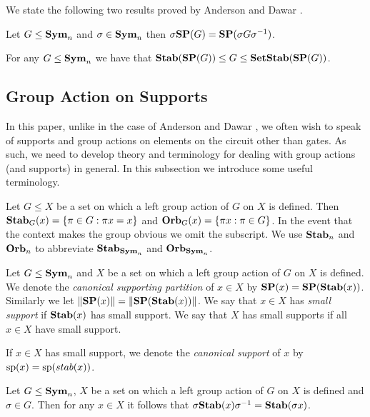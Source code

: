 \documentclass[../paper.tex]{subfiles}
\begin{document}
We state the following two results proved by Anderson and Dawar
\cite{AndersonD17}.

\begin{lem}
  \label{lem:SP_conjugation}
  Let $G \leq \text{\textbf{Sym}}_n$ and $\sigma \in \text{\textbf{Sym}}_n$ then $\sigma \text{\textbf{SP}} (G) = \text{\textbf{SP}}(\sigma
  G \sigma^{-1})$.
\end{lem}

\begin{lem}
  For any $G \leq \text{\textbf{Sym}}_n$ we have that $\text{\textbf{Stab}} (\text{\textbf{SP}} (G)) \leq G \leq
  \text{\textbf{SetStab}}(\text{\textbf{SP}}(G))$.
\end{lem}

\subsection{Group Action on Supports}
In this paper, unlike in the case of Anderson and Dawar \cite{AndersonD17}, we
often wish to speak of supports and group actions on elements on the circuit other than gates. As such, we need to develop theory and terminology for dealing with group actions (and
supports) in general. In this subsection we introduce some useful terminology.


\begin{definition}
  Let $G \leq X$ be a set on which a left group action of $G$ on $X$ is defined.
  Then $\text{\textbf{Stab}}_G (x) = \{\pi \in G : \pi x = x\}$ and $\text{\textbf{Orb}}_G (x) = \{\pi x : \pi
  \in G\}$. In the event that the context makes the group obvious we omit the
  subscript. We use $\text{\textbf{Stab}}_n$ and $\text{\textbf{Orb}}_n$ to abbreviate $\text{\textbf{Stab}}_{\text{\textbf{Sym}}_n}$ and
  $\text{\textbf{Orb}}_{\text{\textbf{Sym}}_n}$.
\end{definition}

\begin{definition}
  Let $G \leq \text{\textbf{Sym}}_n$ and $X$ be a set on which a left group action of $G$ on
  $X$ is defined. We denote the \emph{canonical supporting partition} of $x\in
  X$ by $\text{\textbf{SP}} (x) = \text{\textbf{SP}} (\text{\textbf{Stab}}(x))$. Similarly we let $\| \text{\textbf{SP}} (x) \| = \| \text{\textbf{SP}}
  (\text{\textbf{Stab}}(x)) \|$. We say that $x \in X$ has \emph{small support} if $\text{\textbf{Stab}}(x)$
  has small support. We say that $X$ has small supports if all $x \in X$
  have small support.

  If $x \in X$ has small support, we denote the \emph{canonical support} of $x$
  by $\text{sp}(x) = \text{sp} (stab(x))$.
\end{definition}

\begin{lem}
  \label{lem:stab_conjugation}
  Let $G \leq \text{\textbf{Sym}}_n$, $X$ be a set on which a left group action of $G$ on $X$
  is defined and $\sigma \in G$. Then for any $x \in X$ it follows that $\sigma
  \text{\textbf{Stab}} (x) \sigma^{-1} = \text{\textbf{Stab}}(\sigma x)$.
\end{lem}
\end{document}
